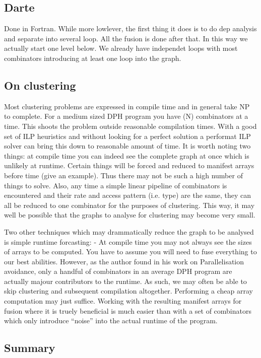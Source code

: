 \documentclass[preamble.tex]{subfiles}
\begin{document}
\subsection{Darte}

Done in Fortran. While more lowlever, the first thing it does is to do dep analysis and separate into several loop. All the fusion is done after that. In this way we actually start one level below. We already have independet loops with most combinators introducing at least one loop into the graph.

\subsection{On clustering}

Most clustering problems are expressed in compile time and in general take NP to complete. For a medium sized DPH program you have (N) combinators at a time. This shoots the problem outside reasonable compilation times. With a good set of ILP heuristics and without looking for a perfect solution a performat ILP solver can bring this down to reasonable amount of time. It is worth noting two things: at compile time you can indeed see the complete graph at once which is unlikely at runtime. Certain things will be forced and reduced to manifest arrays before time (give an example). Thus there may not be such a high number of things to solve. Also, any time a simple linear pipeline of combinators is encountered and their rate and access pattern (i.e. type) are the same, they can all be reduced to one combinator for the purposes of clustering. This way, it may well be possible that the graphs to analyse for clustering may become very small.

Two other techniques which may drammatically reduce the graph to be analysed is simple runtime forcasting:
- At compile time you may not always see the sizes of arrays to be computed. You have to assume you will need to fuse everything to our best abilities. However, as the author found in his work on Parallelisation avoidance, only a handful of combinators in an average DPH program are actually majour contributors to the runtime. As such, we may often be able to skip clustering and subsequent compilation altogether. Performing a cheap array computation may just suffice. Working with the resulting manifest arrays for fusion where it is truely beneficial is much easier than with a set of combinators which only introduce ``noise'' into the actual runtime of the program.

\subsection{Summary}
\end{document}
